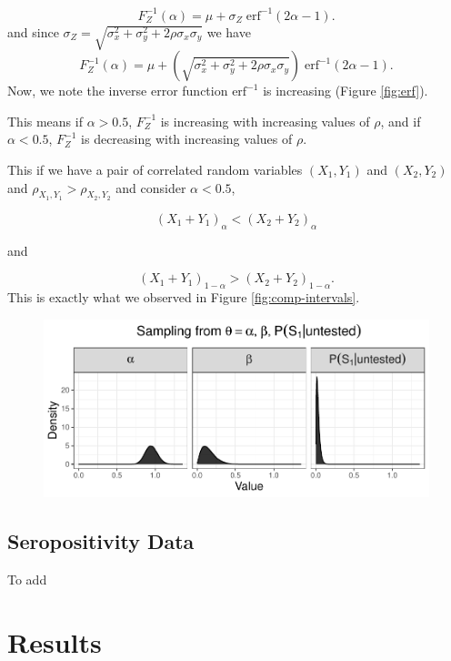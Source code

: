 \documentclass[12pt,twoside]{smiththesis}
\begin{document}
\[F_Z^{-1}(\alpha)=\mu +\sigma_Z \; \text{erf}^{-1}(2\alpha - 1).\]
and since \(\sigma_Z=\sqrt{\sigma_x^2 +\sigma_y^2 + 2 \rho \sigma_x \sigma_y }\) we have
\[F_Z^{-1}(\alpha)=\mu + \left(\sqrt{\sigma_x^2 +\sigma_y^2 + 2 \rho \sigma_x \sigma_y } \right) \; \text{erf}^{-1}(2\alpha - 1).\]
Now, we note the inverse error function \(\text{erf}^{-1}\) is increasing (Figure \ref{fig:erf}).

This means if \(\alpha > 0.5\), \(F_Z^{-1}\) is increasing with increasing values of \(\rho\), and if \(\alpha < 0.5\), \(F_Z^{-1}\) is decreasing with increasing values of \(\rho\).

This if we have a pair of correlated random variables \((X_1,Y_1)\) and \((X_2,Y_2)\) and \(\rho_{X_1,Y_1} > \rho_{X_2,Y_2}\) and consider \(\alpha < 0.5\),

\[(X_1+Y_1)_\alpha <(X_2+Y_2)_\alpha\]

and

\[(X_1+Y_1)_{1-\alpha} > (X_2+Y_2)_{1-\alpha}.\]
This is exactly what we observed in Figure \ref{fig:comp-intervals}.
\begin{figure}

{\centering \includegraphics{thesis_files/figure-latex/unnamed-chunk-8-1} 

}

\caption{\label{fig:erf}}\label{fig:unnamed-chunk-8}
\end{figure}
\hypertarget{seropositivity-data}{%
\section{Seropositivity Data}\label{seropositivity-data}}

To add

\hypertarget{results-1}{%
\chapter{Results}\label{results-1}}
\end{document}

